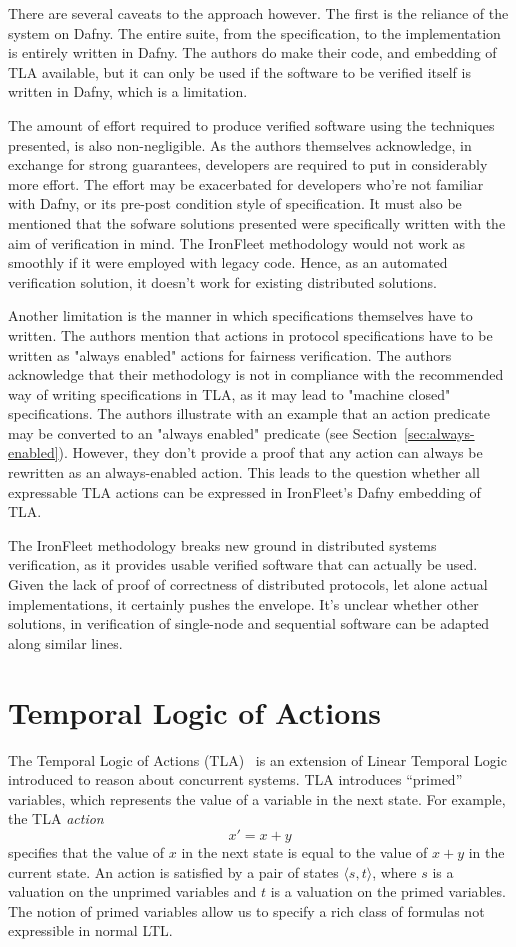 \documentclass{llncs}
\begin{document}
There are several caveats to the approach however. The first is the reliance of the system on Dafny.
 The entire suite, from the specification, to the implementation is entirely written in Dafny. The 
 authors do make their code, and embedding of TLA available, but it can only be used if the software
 to be verified itself is written in Dafny, which is a limitation. 

 The amount of effort required to produce verified software using the techniques presented, is also 
 non-negligible. As the authors themselves acknowledge, in exchange for strong guarantees, developers
 are required to put in considerably more effort. The effort may be exacerbated for developers who're 
 not familiar with Dafny, or its pre-post condition style of specification. 
 It must also be mentioned that the sofware solutions presented were specifically written with 
 the aim of verification in mind. The IronFleet methodology would not work as smoothly if it were
 employed with legacy code. Hence, as an automated verification solution, it doesn't work for 
 existing distributed solutions. 

 Another limitation is the manner in which specifications themselves have to written. The 
 authors mention that actions in protocol specifications have to be written as "always enabled"
 actions for fairness verification. The authors acknowledge that their methodology is not 
 in compliance with the recommended way of writing specifications in TLA, as it may lead
 to "machine closed" specifications. The authors illustrate with an example that an action
 predicate may be converted to an "always enabled" predicate 
 (see Section~\ref{sec:always-enabled}). However, they don't provide a proof that any
 action can always be rewritten as an always-enabled action. This leads to the question
 whether all expressable TLA actions can be expressed in IronFleet's Dafny embedding of TLA.

 The IronFleet methodology breaks new ground in distributed systems verification, as it 
 provides usable verified software that can actually be used. Given the lack of proof of 
 correctness of distributed protocols, let alone actual implementations, it certainly 
 pushes the envelope. It's unclear whether other solutions, in verification of single-node and
 sequential software can be adapted along similar lines.

 
%
\section{Temporal Logic of Actions}\label{sec:tla}
The Temporal Logic of Actions (TLA)~\cite{tla-lamport} is an extension of Linear Temporal
Logic introduced to reason about concurrent systems. TLA introduces ``primed''
variables, which represents the value of a variable in the next state. For
example, the TLA \textit{action} $$x' = x + y$$ specifies that the value of $x$
in the next state is equal to the value of $x + y$ in the current state. An
action is satisfied by a pair of states $\langle s, t \rangle$, where $s$ is a
valuation on the unprimed variables and $t$ is a valuation on the primed
variables. The notion of primed variables allow us to specify a rich class of
formulas not expressible in normal LTL.
\end{document}

